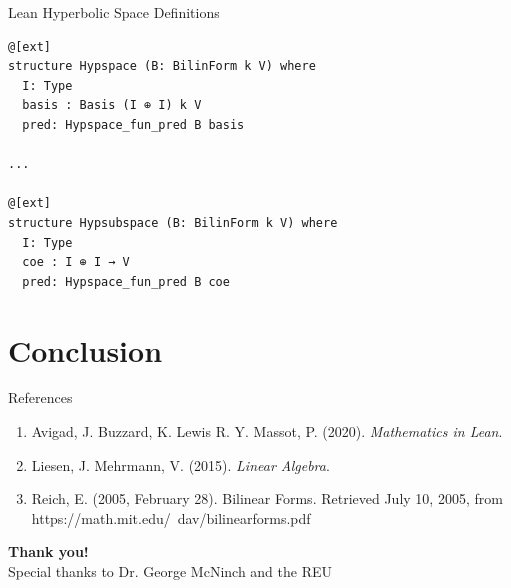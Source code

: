 \documentclass[svgnames]{beamer}
\begin{document}
\begin{frame}[label={sec_proof_comparison},fragile]{Lean Hyperbolic Space Definitions}

{\scriptsize
\begin{verbatim}
@[ext]
structure Hypspace (B: BilinForm k V) where
  I: Type
  basis : Basis (I ⊕ I) k V
  pred: Hypspace_fun_pred B basis

...

@[ext]
structure Hypsubspace (B: BilinForm k V) where
  I: Type
  coe : I ⊕ I → V
  pred: Hypspace_fun_pred B coe
\end{verbatim}
}

\end{frame}


\section{Conclusion}

\begin{frame}{References}
\begin{enumerate}
\item Avigad, J. Buzzard, K. Lewis R. Y. Massot, P. (2020). \textit{Mathematics in Lean}. 
\item Liesen, J. Mehrmann, V. (2015). \textit{Linear Algebra}.
\item Reich, E. (2005, February 28). Bilinear Forms. Retrieved July 10, 2005, from https://math.mit.edu/~dav/bilinearforms.pdf

\end{enumerate}
\end{frame}


\begin{frame}
	    \begin{center}
	        \textbf{Thank you!}\\
	        
	        Special thanks to Dr. George McNinch and the REU
         \bigbreak
         \LARGE
       
	    \end{center}
\end{frame}
\end{document}
